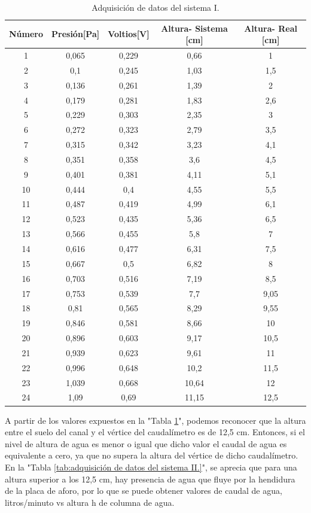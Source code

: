 \begin{table}[htpb]
	\centering
	\caption[Adquisición de datos del sistema I]{Adquisición de datos del sistema I.}
	\begin{tabular}{c c c c c}    
		\toprule
		\textbf{Número}   & \textbf{Presión[Pa]}  & \textbf{Voltios[V]} & \textbf{Altura- Sistema [cm]} & \textbf{Altura- Real [cm]} \\
		\midrule
		1  & 0,065 & 0,229  & 0,66  & 1 \\
		2  & 0,1   & 0,245  & 1,03  & 1,5 \\
		3  & 0,136 & 0,261  & 1,39  & 2 \\
		4  & 0,179 & 0,281  & 1,83  & 2,6 \\
		5  & 0,229 & 0,303	& 2,35  & 3  \\
		6  & 0,272 & 0,323  & 2,79  & 3,5 \\
		7  & 0,315 & 0,342	& 3,23  & 4,1 \\
		8  & 0,351 & 0,358	& 3,6   & 4,5   \\
		9  & 0,401 & 0,381	& 4,11	& 5,1 \\
		10 & 0,444 & 0,4	& 4,55	& 5,5 \\
		11 & 0,487 & 0,419	& 4,99	& 6,1 \\
		12 & 0,523 & 0,435	& 5,36	& 6,5 \\
		13 & 0,566 & 0,455	& 5,8	& 7 \\
		14 & 0,616 & 0,477	& 6,31	& 7,5 \\
		15 & 0,667 & 0,5	& 6,82	& 8 \\
		16 & 0,703 & 0,516	& 7,19	& 8,5 \\
		17 & 0,753 & 0,539	& 7,7	& 9,05 \\
		18 & 0,81  & 0,565	& 8,29	& 9,55 \\
		19 & 0,846 & 0,581	& 8,66	& 10 \\
		20 & 0,896 & 0,603	& 9,17	& 10,5 \\
		21 & 0,939 & 0,623	& 9,61	& 11 \\
		22 & 0,996 & 0,648	& 10,2	& 11,5 \\
		23 & 1,039 & 0,668	& 10,64	& 12\\
		24 & 1,09  & 0,69	& 11,15	& 12,5 \\

	
		\bottomrule
		\hline
	\end{tabular}
	\label{tab:adquisición de datos del sistema I.}
\end{table}
A partir de los valores expuestos en la "Tabla \ref{tab:adquisición de datos del sistema I.}", podemos reconocer que la altura entre el suelo del canal y el vértice del caudalímetro es de 12,5 cm. Entonces, si el nivel de altura de agua es menor o igual que dicho valor el caudal de agua es equivalente a cero, ya que no supera la altura del vértice de dicho caudalímetro.
En la "Tabla \ref{tab:adquisición de datos del sistema II.}", se aprecia que para una altura superior a los 12,5 cm, hay presencia de agua que fluye por la hendidura de la placa de aforo, por lo que se puede obtener valores de caudal de agua, litros/minuto vs altura h de columna de agua.
 
